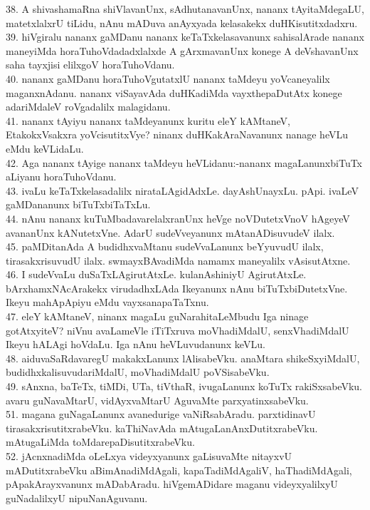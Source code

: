 \documentclass{article}
\begin{document}
38. A shivashamaRna shiVlavanUnx, sAdhutanavanUnx, nananx tAyitaMdegaLU, matetxlalxrU tiLidu, nAnu mADuva anAyxyada kelasakekx duHKisutitxdadxru.\\
39. hiVgiralu nananx gaMDanu nananx keTaTxkelasavanunx sahisalArade nananx maneyiMda horaTuhoVdadadxlalxde A gArxmavanUnx konege A deVshavanUnx saha tayxjisi elilxgoV horaTuhoVdanu.\\
40. nananx gaMDanu horaTuhoVgutatxlU nananx taMdeyu yoVcaneyalilx maganxnAdanu. nananx viSayavAda duHKadiMda vayxthepaDutAtx konege adariMdaleV roVgadalilx malagidanu.\\
41. nananx tAyiyu nananx taMdeyanunx kuritu eleY kAMtaneV, EtakokxVsakxra yoVcisutitxVye? ninanx duHKakAraNavanunx nanage heVLu eMdu keVLidaLu.\\
42. Aga nananx tAyige nananx taMdeyu heVLidanu:-nananx magaLanunxbiTuTx aLiyanu horaTuhoVdanu.\\
43. ivaLu keTaTxkelasadalilx nirataLAgidAdxLe. dayAshUnayxLu. pApi. ivaLeV gaMDananunx biTuTxbiTaTxLu.\\
44. nAnu nananx kuTuMbadavarelalxranUnx heVge noVDutetxVnoV hAgeyeV avananUnx kANutetxVne. AdarU sudeVveyanunx mAtanADisuvudeV ilalx.\\
45. paMDitanAda A budidhxvaMtanu sudeVvaLanunx beYyuvudU ilalx, tirasakxrisuvudU ilalx. swmayxBAvadiMda namamx maneyalilx vAsisutAtxne.\\
46. I sudeVvaLu duSaTxLAgirutAtxLe. kulanAshiniyU AgirutAtxLe. bArxhamxNAcArakekx virudadhxLAda Ikeyanunx nAnu biTuTxbiDutetxVne. Ikeyu mahApApiyu eMdu vayxsanapaTaTxnu.\\
47. eleY kAMtaneV, ninanx magaLu guNarahitaLeMbudu Iga ninage gotAtxyiteV? niVnu avaLameVle iTiTxruva moVhadiMdalU, senxVhadiMdalU Ikeyu hALAgi hoVdaLu. Iga nAnu heVLuvudanunx keVLu.\\
48. aiduvaSaRdavaregU makakxLanunx lAlisabeVku. anaMtara shikeSxyiMdalU, budidhxkalisuvudariMdalU, moVhadiMdalU poVSisabeVku.\\
49. sAnxna, baTeTx, tiMDi, UTa, tiVthaR, ivugaLanunx koTuTx rakiSxsabeVku. avaru guNavaMtarU, vidAyxvaMtarU AguvaMte parxyatinxsabeVku.\\
51. magana guNagaLanunx avanedurige vaNiRsabAradu. parxtidinavU tirasakxrisutitxrabeVku. kaThiNavAda mAtugaLanAnxDutitxrabeVku. mAtugaLiMda toMdarepaDisutitxrabeVku.\\
52. jAcnxnadiMda oLeLxya videyxyanunx gaLisuvaMte nitayxvU mADutitxrabeVku aBimAnadiMdAgali, kapaTadiMdAgaliV, haThadiMdAgali, pApakArayxvanunx mADabAradu. hiVgemADidare maganu videyxyalilxyU guNadalilxyU nipuNanAguvanu.\\
\end{document}
